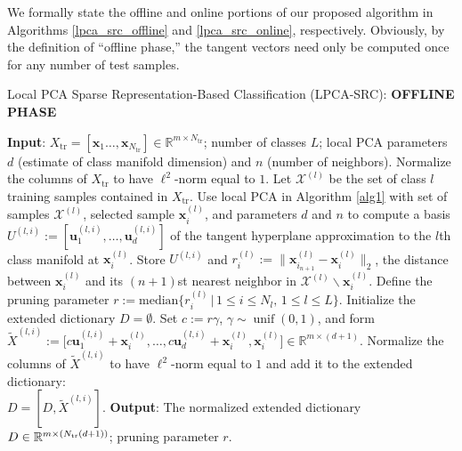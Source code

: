 \documentclass[review]{elsarticle}
\newcommand{\unif}{\operatorname{unif}}
\begin{document}
We formally state the offline and online portions of our proposed algorithm in Algorithms \ref{lpca_src_offline} and \ref{lpca_src_online}, respectively. Obviously, by the definition of ``offline phase,'' the tangent vectors need only be computed once for any number of test samples. 

\begin{algorithm}
\caption{Local PCA Sparse Representation-Based Classification (LPCA-SRC): \textbf{OFFLINE PHASE}}
\label{lpca_src_offline} 
\begin{algorithmic}[1]
\STATE \textbf{Input}: $X_\mathrm{tr} = [\bm{x}_1 \ldots, \bm{x}_{N_{\mathrm{tr}}}] \in \mathbb{R}^{m\times N_\mathrm{tr}}$; number of classes $L$; local PCA parameters $d$ (estimate of class manifold dimension) and $n$ (number of neighbors).
\STATE Normalize the columns of $X_\mathrm{tr}$ to have $\ell^2$-norm equal to $1$.
\STATE Let $\mathcal{X}^{(l)}$ be the set of class $l$ training samples contained in $X_\mathrm{tr}$. 
\STATE Use local PCA in Algorithm \ref{alg1} with set of samples $\mathcal{X}^{(l)}$, selected sample $\bm{x}_i^{(l)}$, and parameters $d$ and $n$ to compute a basis $U^{(l,i)} := [\bm{u}_1^{(l,i)},\ldots,\bm{u}_{d}^{(l,i)}]$ of the tangent hyperplane approximation to the $l$th class manifold at $\bm{x}_i^{(l)}$. Store $U^{(l,i)}$ and $r_i^{(l)} := \| \bm{x}_{i_{n+1}}^{(l)}-\bm{x}_i^{(l)} \|_2$, the distance between $\bm{x}_i^{(l)}$ and its $(n+1)$st nearest neighbor in $\mathcal{X}^{(l)}\backslash \bm{x}_i^{(l)}$. 
\ENDFOR
\ENDFOR
\STATE Define the pruning parameter $r := \text{median} \big\{ r_i^{(l)}\, | \, 1\leq i \leq N_l, \, 1\leq l \leq L \big\}$.
\STATE Initialize the extended dictionary $D = \emptyset$. 
\STATE Set $c:= r \gamma$, $\gamma \sim \unif(0,1)$, and form $\tilde{X}^{(l,i)} := \big[c\bm{u}_1^{(l,i)} + \bm{x}_i^{(l)},\ldots,c\bm{u}_{d}^{(l,i)} + \bm{x}_i^{(l)}, \bm{x}_i^{(l)}\big] \in \mathbb{R}^{m\times(d+1)}$.
\STATE Normalize the columns of $\tilde{X}^{(l,i)}$ to have $\ell^2$-norm equal to $1$ and add it to the extended dictionary: \\
$D = [D,\tilde{X}^{(l,i)}]$.
\ENDFOR
\ENDFOR
\STATE \textbf{Output}: The normalized extended dictionary $D \in \mathbb{R}^{m\times (N_\mathrm{\textnormal{tr}}(d+1))}$; pruning parameter $r$.
\end{algorithmic}
\end{algorithm}
\end{document}
